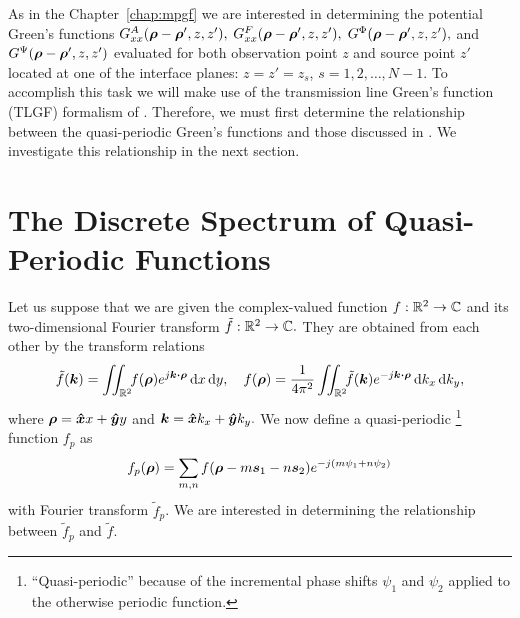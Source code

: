 As in the Chapter~\ref{chap:mpgf} we are interested in determining the
potential Green's functions
$G^A_{xx}(\boldsymbol{\rho}-\boldsymbol{\rho}',z,z'),$ 
$G^F_{xx}(\boldsymbol{\rho}-\boldsymbol{\rho}',z,z'),$ 
$G^\Phi(\boldsymbol{\rho}-\boldsymbol{\rho}',z,z'),$ and $G^\Psi(\boldsymbol{\rho}-\boldsymbol{\rho}',z,z')$
 evaluated for both observation point
$z$ and source point $z'$ located at one of the interface
planes: $z=z'=z_s$, $s=1,2,\ldots,N-1.$  To accomplish this task we
will make use of the
transmission line Green's function (TLGF) formalism of \cite{mimo:97}.
Therefore, we must first determine the relationship between the
quasi-periodic Green's functions and those discussed in
\cite{mimo:97}. We investigate this relationship in the next section.

\section{The Discrete Spectrum of Quasi-Periodic Functions}
Let us suppose that we are given the complex-valued function $f:
\mathbb{R}^2 \rightarrow \mathbb{C}$ and its two-dimensional Fourier
transform $\tilde{f}: \mathbb{R}^2 \rightarrow \mathbb{C}.$ They are
obtained from each other by the transform relations
\begin{equation}
  \tilde{f}(\boldsymbol{k}) = \iint_{\mathbb{R}^2} \!\! f(\boldsymbol{\rho}) e^{j\boldsymbol{k} \boldsymbol{\cdot}
  \boldsymbol{\rho}} \,
  \text{d} x \, \text{d} y, \quad
  f(\boldsymbol{\rho}) = \frac{1}{4\pi^2}\iint_{\mathbb{R}^2} \!\! \tilde{f}(\boldsymbol{k}) e^{-j\boldsymbol{k} \boldsymbol{\cdot}
  \boldsymbol{\rho}} \,
  \text{d} k_x \, \text{d} k_y,
\end{equation}
where $\boldsymbol{\rho} = \boldsymbol{\hat{x}} x + \boldsymbol{\hat{y}} y$ and $\boldsymbol{k} = \boldsymbol{\hat{x}} k_x + \boldsymbol{\hat{y}} k_y.$
We now define a quasi-periodic%
%
\footnote{``Quasi-periodic'' because of the 
  incremental phase shifts $\psi_1$ and $\psi_2$
  applied to the otherwise periodic function.}%
%
function $f_p$ as
\begin{equation}
  f_p(\boldsymbol{\rho}) = \sum_{m,n} f(\boldsymbol{\rho} - m\boldsymbol{s}_1 - n\boldsymbol{s}_2) e^{-j(m\psi_1+n\psi_2)}
\end{equation}
with Fourier transform $\tilde{f}_p$.
We are interested in determining the relationship between
$\tilde{f}_p$ and $\tilde{f}.$

